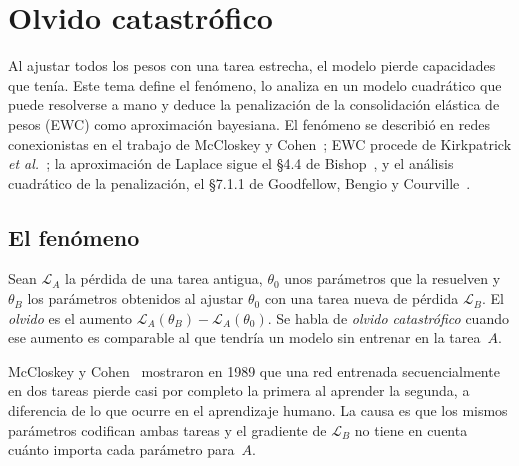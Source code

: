 \chapter{Olvido catastrófico}
\label{tema:3}

Al ajustar todos los pesos con una tarea estrecha, el modelo pierde capacidades que tenía. Este tema define el fenómeno, lo analiza en un modelo cuadrático que puede resolverse a mano y deduce la penalización de la consolidación elástica de pesos (EWC) como aproximación bayesiana. El fenómeno se describió en redes conexionistas en el trabajo de McCloskey y Cohen~\cite{mccloskey}; EWC procede de Kirkpatrick \emph{et al.}~\cite{kirkpatrick}; la aproximación de Laplace sigue el §4.4 de Bishop~\cite{bishop}, y el análisis cuadrático de la penalización, el §7.1.1 de Goodfellow, Bengio y Courville~\cite{gbc}.

\section{El fenómeno}

\begin{definicion}[Olvido]\label{def:olvido}
Sean $\mathcal{L}_A$ la pérdida de una tarea antigua, $\theta_0$ unos parámetros que la resuelven y $\theta_B$ los parámetros obtenidos al ajustar $\theta_0$ con una tarea nueva de pérdida $\mathcal{L}_B$. El \emph{olvido} es el aumento $\mathcal{L}_A(\theta_B)-\mathcal{L}_A(\theta_0)$. Se habla de \emph{olvido catastrófico} cuando ese aumento es comparable al que tendría un modelo sin entrenar en la tarea~$A$.
\end{definicion}

McCloskey y Cohen~\cite{mccloskey} mostraron en 1989 que una red entrenada secuencialmente en dos tareas pierde casi por completo la primera al aprender la segunda, a diferencia de lo que ocurre en el aprendizaje humano. La causa es que los mismos parámetros codifican ambas tareas y el gradiente de $\mathcal{L}_B$ no tiene en cuenta cuánto importa cada parámetro para~$A$.

